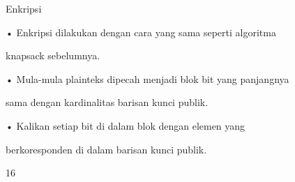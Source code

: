 \documentclass{article}
\begin{document}

Enkripsi

• Enkripsi dilakukan dengan cara yang sama seperti algoritma 

knapsack sebelumnya.

• Mula-mula plainteks dipecah menjadi blok bit yang panjangnya 

sama dengan kardinalitas barisan kunci publik.  

• Kalikan setiap bit di dalam blok dengan elemen yang 

berkoresponden di dalam barisan kunci publik.

16
\end{document}
